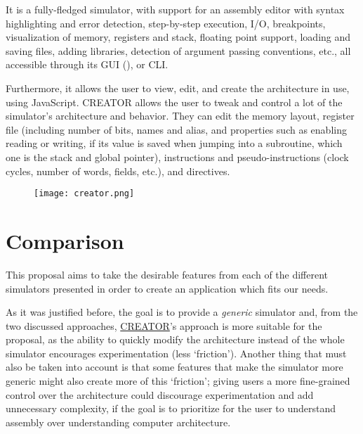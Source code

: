 It is a fully-fledged simulator, with support for an \gls{assembly} editor with syntax highlighting and error detection, step-by-step execution, \gls{I/O}, breakpoints, visualization of \gls{memory}, \glspl{register} and \gls{stack}, floating point support, loading and saving files, adding libraries, detection of argument passing conventions, etc., all accessible through its \gls{GUI} (), or \gls{CLI}.

Furthermore, it allows the user to view, edit, and create the architecture in use, using JavaScript. CREATOR allows the user to tweak and control a lot of the simulator's architecture and behavior. They can edit the \gls{memory} layout, register file (including number of bits, names and alias, and properties such as enabling reading or writing, if its value is saved when jumping into a \gls{subroutine}, which one is the stack and global pointer), \glspl{instruction} and \glspl{pseudo-instruction} (\glspl{clock cycle}, number of words, fields, etc.), and \glspl{directive}.


\begin{figure}[htb]
    {\texttt{[image: creator.png]}}
\end{figure}



\section{Comparison}\label{sec:comparison}
This proposal aims to take the desirable features from each of the different simulators presented in order to create an application which fits our needs.

As it was justified before, the goal is to provide a \textit{generic} simulator and, from the two discussed approaches, \hyperref[subsubsec:creator]{CREATOR}'s approach is more suitable for the proposal, as the ability to quickly modify the architecture instead of  the whole simulator encourages experimentation (less `friction'). Another thing that must also be taken into account is that some features that make the simulator more generic might also create more of this `friction'; giving users a more fine-grained control over the architecture could discourage experimentation and add unnecessary complexity, if the goal is to prioritize for the user to understand \gls{assembly} over understanding computer architecture.

